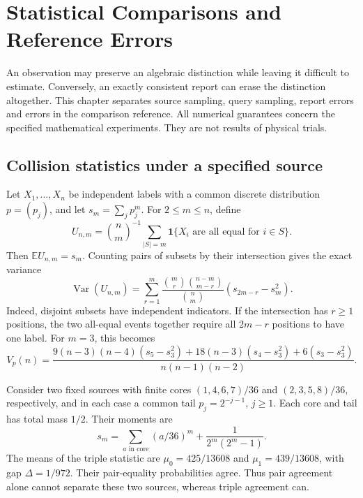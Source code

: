 \section{Statistical Comparisons and Reference Errors}
\label{sam:chapter}

An observation may preserve an algebraic distinction while leaving it difficult to estimate. Conversely, an exactly consistent report can erase the distinction altogether. This chapter separates source sampling, query sampling, report errors and errors in the comparison reference. All numerical guarantees concern the specified mathematical experiments. They are not results of physical trials.

\subsection{Collision statistics under a specified source}
\label{sam:collisions}
Let $X_1,\ldots,X_n$ be independent labels with a common discrete distribution $p=(p_j)$, and let $s_m=\sum_jp_j^m$. For $2\le m\le n$, define
\[
 U_{n,m}=\binom nm^{-1}\sum_{|S|=m}\mathbf1\{X_i\text{ are all equal for }i\in S\}.
\]
Then $\mathbb E U_{n,m}=s_m$. Counting pairs of subsets by their intersection gives the exact variance
\begin{equation}
 \operatorname{Var}(U_{n,m})=
 \sum_{r=1}^m\frac{\binom mr\binom{n-m}{m-r}}{\binom nm}
 (s_{2m-r}-s_m^2).
 \label{sam:uvariance}
\end{equation}
Indeed, disjoint subsets have independent indicators. If the intersection has $r\ge1$ positions, the two all-equal events together require all $2m-r$ positions to have one label. For $m=3$, this becomes
\begin{equation}
 V_p(n)=\frac{9(n-3)(n-4)(s_5-s_3^2)+18(n-3)(s_4-s_3^2)+6(s_3-s_3^2)}{n(n-1)(n-2)}.
 \label{sam:v3}
\end{equation}

Consider two fixed sources with finite cores $(1,4,6,7)/36$ and $(2,3,5,8)/36$, respectively, and in each case a common tail $p_j=2^{-j-1}$, $j\ge1$. Each core and tail has total mass $1/2$. Their moments are
\[
 s_m=\sum_{a\text{ in core}}(a/36)^m+\frac1{2^m(2^m-1)}.
\]
The means of the triple statistic are $\mu_0=425/13608$ and $\mu_1=439/13608$, with gap $\Delta=1/972$. Their pair-equality probabilities agree. Thus pair agreement alone cannot separate these two sources, whereas triple agreement can.

